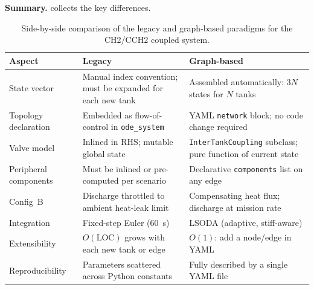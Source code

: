 \bigskip
\noindent\textbf{Summary.}   collects the key differences.

\begin{table}[ht]
\centering
\caption{Side-by-side comparison of the legacy and graph-based paradigms for
the CH2/CCH2 coupled system.}
\label{tab:comparison}
\begin{tabularx}{\linewidth}{@{} l X X @{}}
\toprule
\textbf{Aspect} & \textbf{Legacy} & \textbf{Graph-based} \\
\midrule
State vector
  & Manual index convention; must be expanded for each new tank
  & Assembled automatically: $3N$ states for $N$ tanks \\[4pt]
Topology declaration
  & Embedded as flow-of-control in \texttt{ode\_system}
  & YAML \texttt{network} block; no code change required \\[4pt]
Valve model
  & Inlined in RHS; mutable global state
  & \texttt{InterTankCoupling} subclass; pure function of current state \\[4pt]
Peripheral components
  & Must be inlined or pre-computed per scenario
  & Declarative \texttt{components} list on any edge \\[4pt]
Config~B
  & Discharge throttled to ambient heat-leak limit
  & Compensating heat flux; discharge at mission rate \\[4pt]
Integration
  & Fixed-step Euler (\SI{60}{\second})
  & LSODA (adaptive, stiff-aware) \\[4pt]
Extensibility
  & $O(\text{LOC})$ grows with each new tank or edge
  & $O(1)$: add a node/edge in YAML \\[4pt]
Reproducibility
  & Parameters scattered across Python constants
  & Fully described by a single YAML file \\
\bottomrule
\end{tabularx}
\end{table}

